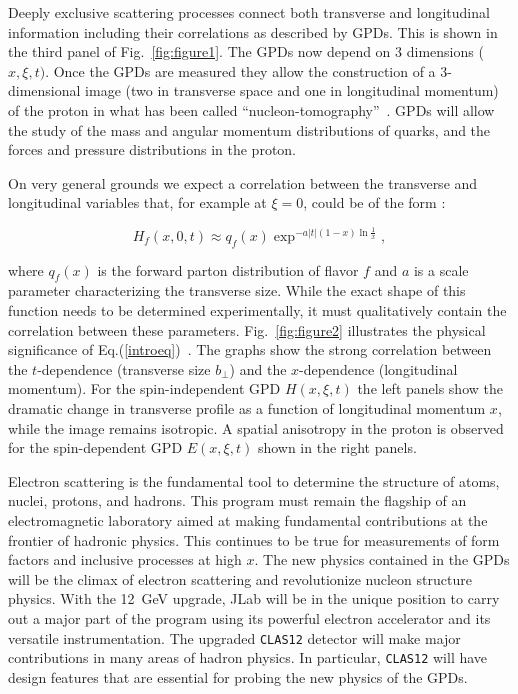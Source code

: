 Deeply exclusive scattering processes connect both transverse and longitudinal 
information including their correlations as described by GPDs. This is shown 
in the third panel of Fig.~\ref{fig:figure1}. The GPDs now depend on 3 
dimensions ($x,\xi,t)$.  Once the GPDs are measured they allow the 
construction of a 3-dimensional image (two in transverse space and one in 
longitudinal momentum) of the proton in what has been called 
``nucleon-tomography''~\cite{burkardt}.  GPDs will allow the study of the
mass and angular momentum distributions of quarks, and the forces and 
pressure distributions in the proton.  

On very general grounds we expect a correlation between the transverse and 
longitudinal variables that, for example at $\xi=0$, could be of the form
\cite{burkardt}:

\begin{equation}
\label{introeq}
H_f(x,0,t) \approx q_f(x)\exp^{-a|t|(1-x) \ln \frac{1}{x}},
\end{equation}

\noindent
where $q_f (x)$ is the forward parton distribution of flavor $f$ and $a$ is
a scale parameter characterizing the transverse size. While the exact shape 
of this function needs to be determined experimentally, it must qualitatively 
contain the correlation between these parameters. Fig.~\ref{fig:figure2} 
illustrates the physical significance of Eq.(\ref{introeq})~\cite{burkardt}. 
The graphs show the strong correlation between the $t$-dependence (transverse 
size $b_{\perp}$) and the $x$-dependence (longitudinal momentum).  For the 
spin-independent GPD $H(x,\xi,t)$ the left panels show the dramatic change in 
transverse profile as a function of longitudinal momentum $x$, while the 
image remains isotropic.  A spatial anisotropy in the proton is observed for 
the spin-dependent GPD $E(x,\xi,t)$ shown in the right panels.   

Electron scattering is the fundamental tool to determine the structure of 
atoms, nuclei, protons, and hadrons.   This program must remain the flagship 
of an electromagnetic laboratory aimed at making fundamental contributions 
at the frontier of hadronic physics.  This continues to be true for 
measurements of form factors and inclusive processes at high $x$. The new 
physics contained in the GPDs will be the climax of electron scattering and 
revolutionize nucleon structure physics.  With the 12~GeV upgrade, JLab will 
be in the unique position to carry out a major part of the program using its 
powerful electron accelerator and its versatile instrumentation. 
The upgraded {\tt CLAS12} detector will make major contributions in many areas
of hadron physics. In particular, {\tt CLAS12} will have design features that 
are essential for probing the new physics of the GPDs. 

